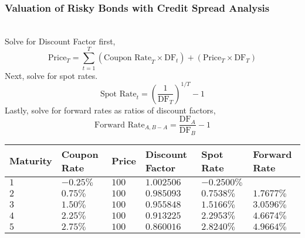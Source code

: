 \subsubsection{Valuation of Risky Bonds with Credit Spread Analysis}

\begin{method} \\
Solve for Discount Factor first,
\begin{equation}
\text{Price}_T = \sum\limits_{t=1}^T (\text{Coupon Rate}_T \times \text{DF}_t) + (\text{Price}_T \times \text{DF}_T) \nonumber
\end{equation}
Next, solve for spot rates.
\begin{equation}
\text{Spot Rate}_t = \left(\frac{1}{\text{DF}_T} \right)^{1/T} - 1 \nonumber
\end{equation}
Lastly, solve for forward rates as ratios of discount factors,
\begin{equation}
\text{Forward Rate}_{A, B-A} = \frac{\text{DF}_A}{\text{DF}_B} - 1 \nonumber
\end{equation}
\end{method}

\begin{flushleft}
\begin{tabularx}{\textwidth}{p{5em}|p{8em}|p{5em}|X|p{5em}|p{8em}}
\hline
\rowcolor{gray!30}
Maturity & Coupon Rate & Price & Discount Factor & Spot Rate & Forward Rate \\
\hline
$1$ & $-0.25\%$ & $100$ & $1.002506$ & $-0.2500\%$ & \\
$2$ & $0.75\%$ & $100$ & $0.985093$ & $0.7538\%$ & $1.7677\%$ \\
$3$ & $1.50\%$ & $100$ & $0.955848$ & $1.5166\%$ & $3.0596\%$ \\
$4$ & $2.25\%$ & $100$ & $0.913225$ & $2.2953\%$ & $4.6674\%$ \\
$5$ & $2.75\%$ & $100$ & $0.860016$ & $2.8240\%$ & $4.9664\%$ \\
\hline
\end{tabularx}
\end{flushleft}

